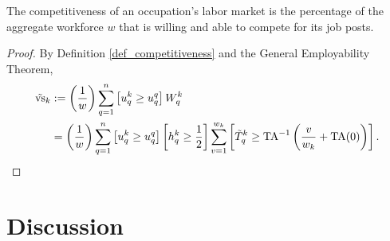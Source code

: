\documentclass[hidelinks, nonatbib]{elsarticle}
\begin{document}
\begin{corollary}
    \label{gcc}
    The competitiveness of an occupation's labor market is the percentage of the aggregate workforce $w$ that is willing and able to compete for its job posts.

    \begin{proof}
        By Definition \ref{def_competitiveness} and the General Employability Theorem,
        \begin{align}
            \tilde{\text{vs}}_{k}
        &:=
        \left(
            \frac{1}{w}
        \right)
        \sum_{q=1}^{n}
        \left[
            u_{q}^{k}
            \geq
            u_{q}^{q}
        \right]
        W_{q}^{k}
        \\
        &=
        \left(
            \frac{1}{w}
        \right)
        \sum_{q=1}^{n}
        \left[
            u_{q}^{k}
            \geq
            u_{q}^{q}
        \right]
        \left[
            h_{q}^{k}
            \geq
            \frac{1}{2}
        \right]
        \sum_{v=1}^{w_k}
        \left[
            \tilde{T}_{q}^{k}
            \geq
            \text{TA}^{-1}
            \left(
                \frac{v}{w_k}
                +
                \text{TA}(0)
            \right)
        \right]
        .
        \end{align}
    \end{proof}
\end{corollary}



\section{Discussion}
\end{document}
